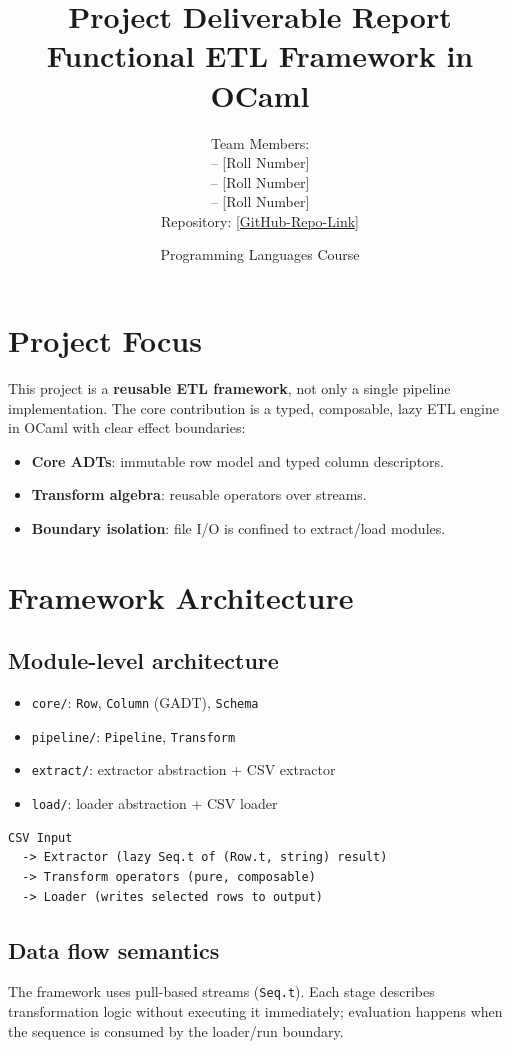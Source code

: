 \documentclass[11pt,a4paper]{article}
\title{Project Deliverable Report\\Functional ETL Framework in OCaml}
\author{
  Team Members: \\
  [Member 1 Name] -- [Roll Number] \\
  [Member 2 Name] -- [Roll Number] \\
  [Member 3 Name] -- [Roll Number] \\
  Repository: \url{[GitHub-Repo-Link]}
}
\date{Programming Languages Course}
\begin{document}
\maketitle
\vspace{-1em}

\section{Project Focus}
This project is a \textbf{reusable ETL framework}, not only a single pipeline implementation. The core contribution is a typed, composable, lazy ETL engine in OCaml with clear effect boundaries:
\begin{itemize}
  \item \textbf{Core ADTs}: immutable row model and typed column descriptors.
  \item \textbf{Transform algebra}: reusable operators over streams.
  \item \textbf{Boundary isolation}: file I/O is confined to extract/load modules.
\end{itemize}

\section{Framework Architecture}
\subsection*{Module-level architecture}
\begin{itemize}
  \item \texttt{core/}: \texttt{Row}, \texttt{Column} (GADT), \texttt{Schema}
  \item \texttt{pipeline/}: \texttt{Pipeline}, \texttt{Transform}
  \item \texttt{extract/}: extractor abstraction + CSV extractor
  \item \texttt{load/}: loader abstraction + CSV loader
\end{itemize}

\begin{lstlisting}[style=compact]
CSV Input
  -> Extractor (lazy Seq.t of (Row.t, string) result)
  -> Transform operators (pure, composable)
  -> Loader (writes selected rows to output)
\end{lstlisting}

\subsection*{Data flow semantics}
The framework uses pull-based streams (\texttt{Seq.t}). Each stage describes transformation logic without executing it immediately; evaluation happens when the sequence is consumed by the loader/run boundary.
\end{document}
